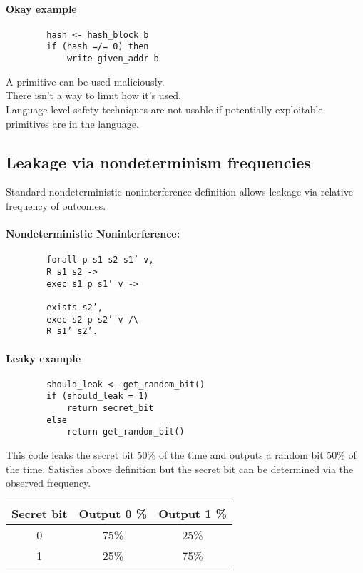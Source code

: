 \documentclass[onecolumn]{paper}
\begin{document}
	\paragraph*{Okay example}
	\begin{verbatim}
		hash <- hash_block b
		if (hash =/= 0) then
			write given_addr b
	\end{verbatim}

	A primitive can be used maliciously.\\
	There isn’t a way to limit how it’s used.\\
	Language level safety techniques are not usable if potentially exploitable primitives are in the language.

	\subsection{Leakage via nondeterminism frequencies}	
	Standard nondeterministic noninterference definition allows leakage via relative frequency of outcomes.
	\paragraph{Nondeterministic Noninterference:}
	
	\begin{verbatim}
		forall p s1 s2 s1’ v,
		R s1 s2 ->
		exec s1 p s1’ v ->
		
		exists s2’,
		exec s2 p s2’ v /\
		R s1’ s2’.
	\end{verbatim} 
	
	
	
	\paragraph*{Leaky example}
	\begin{verbatim}
		should_leak <- get_random_bit()
		if (should_leak = 1)
			return secret_bit
		else
			return get_random_bit()
	\end{verbatim}
	
	This code leaks the secret bit 50\% of the time and outputs a random bit 50\% of the time.
	Satisfies above definition but the secret bit can be determined via the observed frequency.
	
	\begin{tabular}{| c | c | c |}
		\hline
		Secret bit & Output 0 \% & Output 1 \% \\
		\hline
		0 &	75\% & 25\% \\
		\hline
		1 &	25\% & 75\% \\
		\hline
		\end{tabular}
	
\end{document}
